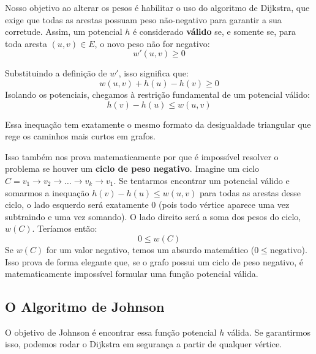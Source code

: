 Nosso objetivo ao alterar os pesos é habilitar o uso do algoritmo de Dijkstra, que exige que todas as arestas possuam peso não-negativo para garantir a sua corretude. Assim, um potencial $h$ é considerado \textbf{válido} se, e somente se, para toda aresta $(u, v) \in E$, o novo peso não for negativo:
$$w'(u, v) \ge 0$$

Substituindo a definição de $w'$, isso significa que:
$$w(u, v) + h(u) - h(v) \ge 0$$
Isolando os potenciais, chegamos à restrição fundamental de um potencial válido:
$$h(v) - h(u) \le w(u, v)$$

Essa inequação tem exatamente o mesmo formato da desigualdade triangular que rege os caminhos mais curtos em grafos. 

Isso também nos prova matematicamente por que é impossível resolver o problema se houver um \textbf{ciclo de peso negativo}. Imagine um ciclo $C = v_1 \rightarrow v_2 \rightarrow \dots \rightarrow v_k \rightarrow v_1$. Se tentarmos encontrar um potencial válido e somarmos a inequação $h(v) - h(u) \le w(u, v)$ para todas as arestas desse ciclo, o lado esquerdo será exatamente $0$ (pois todo vértice aparece uma vez subtraindo e uma vez somando). O lado direito será a soma dos pesos do ciclo, $w(C)$. Teríamos então:
$$0 \le w(C)$$
Se $w(C)$ for um valor negativo, temos um absurdo matemático ($0 \le \text{negativo}$). Isso prova de forma elegante que, se o grafo possui um ciclo de peso negativo, é matematicamente impossível formular uma função potencial válida.

\subsection{O Algoritmo de Johnson}

O objetivo de Johnson é encontrar essa função potencial $h$ válida. Se garantirmos isso, podemos rodar o Dijkstra em segurança a partir de qualquer vértice. 


